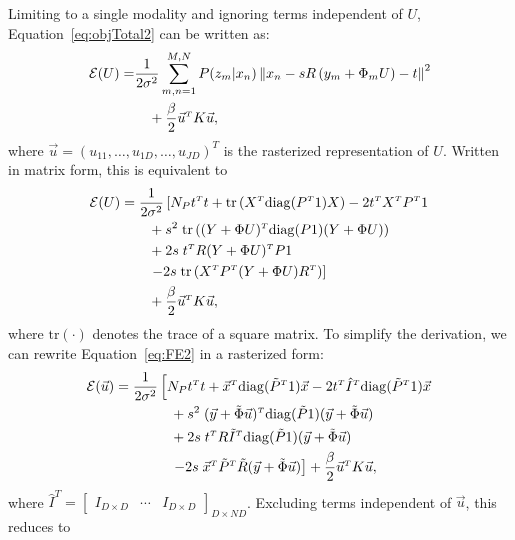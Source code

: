 \documentclass[journal]{IEEEtran}
\newcommand{\trans}[1]{#1^{\scriptscriptstyle T}}
\newcommand{\trace}{\mathrm{tr}}
\newcommand{\diag}{\mathrm{diag}}
\begin{document}
Limiting to a single modality and ignoring terms independent of $U$, Equation~\eqref{eq:objTotal2} can be written as:
\begin{align}\label{eq:FE1}
  \mathcal{E}(U) = & \dfrac{1}{2\sigma^2}\sum_{m,n=1}^{M,N}P(z_m|x_n)\left\|x_n-sR\left(y_m+\Phi_mU\right)-t\right\|^2\notag\\
  & \quad + \dfrac{\beta}{2}\trans{\vec{u}}K\vec{u},
\end{align}
where $\vec{u}=\trans{(u_{11},\ldots,u_{1D},\ldots,u_{JD})}$ is the rasterized representation of $U$. Written in matrix form, this is equivalent to
\begin{align}\label{eq:FE2}
    \mathcal{E}(U) & = \dfrac{1}{2\sigma^2}\left[N_P\trans{t}t + \trace\left(\trans{X}\diag(\trans{P}1)X\right)-2\trans{t}\trans{X}\trans{P}1\right.\notag\\
    & \qquad +s^2\;\trace\left(\trans{(Y+\Phi U)}\diag(P1)(Y+\Phi U)\right) \notag\\
    & \qquad + 2s\;\trans{t}R\trans{(Y+ \Phi U)}P1\notag\\
    & \qquad \left.-2s\;\trace\left(\trans{X}\trans{P}(Y+\Phi U)\trans{R}\right)\right]\notag\\
    & \qquad + \dfrac{\beta}{2}\trans{\vec{u}}K\vec{u},
\end{align}
where $\trace(\cdot)$ denotes the trace of a square matrix. To simplify the derivation, we can rewrite Equation~\eqref{eq:FE2} in a rasterized form:
\begin{align}\label{eq:FE3}
    \mathcal{E}(\vec{u}) & = \dfrac{1}{2\sigma^2}\left[N_P\trans{t}t + \trans{\vec{x}}\diag(\trans{\tilde{P}}1)\vec{x}-2\trans{t}\trans{\hat{I}}\diag(\trans{\tilde{P}}1)\vec{x}\right.\notag\\
    & \qquad\qquad + s^2\;\trans{(\vec{y}+\tilde{\Phi}\vec{u})}\diag(\tilde{P}1)(\vec{y}+\tilde{\Phi}\vec{u})\notag\\
    & \qquad\qquad +2s\;\trans{t}R\trans{\tilde{I}}\diag(\tilde{P}1)(\vec{y}+\tilde{\Phi}\vec{u})\notag\\
    & \qquad\qquad \left.-2s\;\trans{\vec{x}}\trans{\tilde{P}}\tilde{R}(\vec{y}+\tilde{\Phi}\vec{u})\right] + \dfrac{\beta}{2}\trans{\vec{u}}K\vec{u},
\end{align}
where $\trans{\hat{I}} = \begin{bmatrix} I_{D\times D} & \cdots & I_{D\times D} \end{bmatrix}_{D\times ND}$. Excluding terms independent of $\vec{u}$, this reduces to
\end{document}
